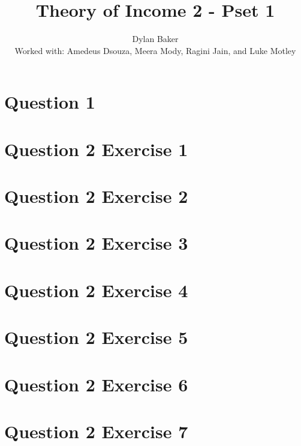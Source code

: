 \documentclass[10pt]{article}
\title{Theory of Income 2 - Pset 1}
\author{Dylan Baker
\\ Worked with: Amedeus Dsouza, Meera Mody, Ragini Jain, and Luke Motley}
\date{}
\begin{document}
\maketitle

\tableofcontents

\section{Question 1}


\pagebreak

\section{Question 2 Exercise 1}


\pagebreak

\section{Question 2 Exercise 2}


\pagebreak

\section{Question 2 Exercise 3}


\pagebreak

\section{Question 2 Exercise 4}


\pagebreak

\section{Question 2 Exercise 5}


\pagebreak

\section{Question 2 Exercise 6}


\pagebreak

\section{Question 2 Exercise 7}

\end{document}
